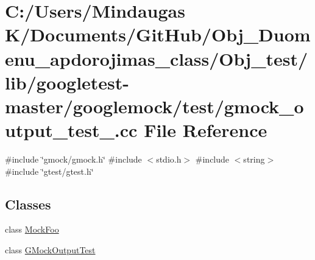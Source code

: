 \hypertarget{_obj__test_2lib_2googletest-master_2googlemock_2test_2gmock__output__test___8cc}{}\section{C\+:/\+Users/\+Mindaugas K/\+Documents/\+Git\+Hub/\+Obj\+\_\+\+Duomenu\+\_\+apdorojimas\+\_\+class/\+Obj\+\_\+test/lib/googletest-\/master/googlemock/test/gmock\+\_\+output\+\_\+test\+\_\+.cc File Reference}
\label{_obj__test_2lib_2googletest-master_2googlemock_2test_2gmock__output__test___8cc}
{\ttfamily \#include \char`\"{}gmock/gmock.\+h\char`\"{}}\newline
{\ttfamily \#include $<$stdio.\+h$>$}\newline
{\ttfamily \#include $<$string$>$}\newline
{\ttfamily \#include \char`\"{}gtest/gtest.\+h\char`\"{}}\newline
\subsection*{Classes}
\begin{DoxyCompactItemize}
\item 
class \mbox{\hyperlink{class_mock_foo}{Mock\+Foo}}
\item 
class \mbox{\hyperlink{class_g_mock_output_test}{G\+Mock\+Output\+Test}}
\end{DoxyCompactItemize}
